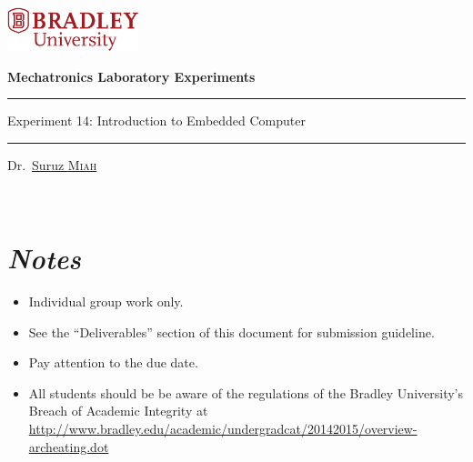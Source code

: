 \documentclass{article}
\def\labTitle{Experiment 14: Introduction to Embedded Computer}
\newcommand{\midskip}[0]{\vspace{3mm}}
\begin{document}
\centerline{\href{http://www.bradley.edu}{\includegraphics[height=0.5in]{figs/logoBU1-Print}}}

\begin{center}
\vspace*{1.0cm}
{\bf \LARGE %
  Mechatronics Laboratory Experiments}



\vspace*{2.0cm}

{\color{BrickRed}
\hrule height 1.5pt
\midskip
}
{\LARGE %
\labTitle%
}\\
\midskip
{\color{BrickRed}
\hrule height 1.5pt
\midskip
}
\vspace*{0.15cm}
\begin{flushright}
{\Large
Dr.~\href{http://personalpages.bradley.edu/~smiah}{Suruz \textsc{Miah}}
}
\end{flushright}

\vspace*{1.0cm}
\noindent
~\hfill{}


\end{center}

\vspace*{1.0cm}
\section*{\textit{Notes}}
\begin{itemize}
\item Individual group work only. 
  
\item See the ``Deliverables'' section of this document for submission guideline. 

\item Pay attention to the due date. %
\item All students should be be aware of the regulations of the Bradley University's Breach of Academic Integrity at \url{http://www.bradley.edu/academic/undergradcat/20142015/overview-archeating.dot}
\end{itemize}
\end{document}
